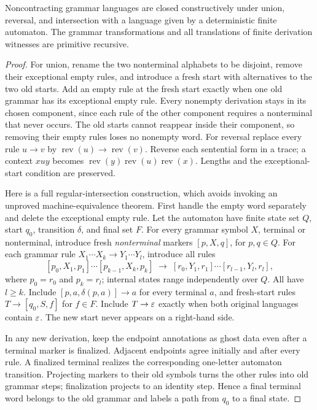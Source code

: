 \begin{proposition}\label{eff:nc-closure}
Noncontracting grammar languages are closed constructively under union,
reversal, and intersection with a language given by a deterministic finite
automaton.  The grammar transformations and all translations of finite
derivation witnesses are primitive recursive.
\end{proposition}
\begin{proof}
For union, rename the two nonterminal alphabets to be disjoint, remove their
exceptional empty rules, and introduce a fresh start with alternatives to
the two old starts.  Add an empty rule at the fresh start exactly when one
old grammar has its exceptional empty rule.  Every nonempty derivation
stays in its chosen component, since each rule of the other component
requires a nonterminal that never occurs.  The old starts cannot reappear
inside their component, so removing their empty rules loses no nonempty
word.  For reversal replace every rule $u\to v$ by
$\operatorname{rev}(u)\to\operatorname{rev}(v)$.  Reverse each sentential
form in a trace; a context $xuy$ becomes
$\operatorname{rev}(y)\operatorname{rev}(u)\operatorname{rev}(x)$.
Lengths and the exceptional-start condition are preserved.

Here is a full regular-intersection construction, which avoids invoking an
unproved machine-equivalence theorem.  First handle the empty word
separately and delete the exceptional empty rule.  Let the automaton have
finite state set $Q$, start $q_0$, transition $\delta$, and final set $F$.
For every grammar symbol $X$, terminal or nonterminal, introduce fresh
\emph{nonterminal} markers $[p,X,q]$, for $p,q\in Q$.
For each grammar rule $X_1\cdots X_k\to Y_1\cdots Y_l$, introduce all rules
\[
 [p_0,X_1,p_1]\cdots[p_{k-1},X_k,p_k]
 \;\to\;
 [r_0,Y_1,r_1]\cdots[r_{l-1},Y_l,r_l],
\]
where $p_0=r_0$ and $p_k=r_l$; internal states range independently over $Q$.
All have $l\geq k$.  Include $[p,a,\delta(p,a)]\to a$ for every terminal
$a$, and fresh-start rules $T\to[q_0,S,f]$ for $f\in F$.
Include $T\to\varepsilon$ exactly when both original languages contain $\varepsilon$.
The new start never appears on a right-hand side.

In any new derivation, keep the endpoint annotations as ghost data even
after a terminal marker is finalized.  Adjacent endpoints agree initially
and after every rule.  A finalized terminal realizes the corresponding
one-letter automaton transition.  Projecting markers to their old symbols
turns the other rules into old grammar steps; finalization projects to an
identity step.  Hence a final terminal word belongs to the old grammar
and labels a path from $q_0$ to a final state.


\end{proof}
